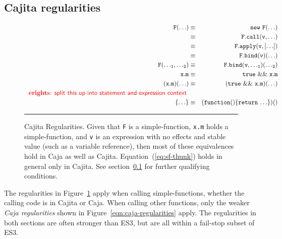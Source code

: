\documentclass[letterpaper,twocolumn,10pt]{article}
\newcommand{\code}[1]{{\tt {#1}}}              %
\begin{document}
\subsection{Cajita regularities}
\label{subsec:cajita-reg}

\begin{figure}
\begin{eqnarray}
  \code{F(\ldots)}                & \equiv & \code{new\ F(\ldots)}                     \label{eq:sf-new} \\
                                  & \equiv & \code{F.call(v,\ldots)}                   \label{eq:sf-call} \\
                                  & \equiv & \code{F.apply(v,[\ldots])}                \label{eq:sf-apply} \\
                                  & \equiv & \code{F.bind(v)(\ldots)}                  \label{eq:sf-bind-1} \\
  \code{F({\ldots}_1,{\ldots}_2)} & \equiv & \code{F.bind(v,{\ldots}_1)({\ldots}_2)}   \label{eq:sf-bind-n} \\
  \code{x.m}                      & \equiv & \code{true\ \&\&\ x.m}                    \label{eq:sf-true} \\
  \code{(x.m)(\ldots)}            & \equiv & \code{(true\ \&\&\ x.m)(\ldots)}          \label{eq:sf-true-call} \\
  \mbox{\TODO{erights}{split this up into statement and expression context}}\\
  \code{\{{\ldots}\}}             & \equiv & \code{(function()\{return\ {\ldots\}})()} \label{eq:sf-thunk}
\end{eqnarray}

\caption[Cajita Regularities.]{Cajita Regularities. Given that \code{F} is a simple-function, \code{x.m} holds a 
simple-function, and \code{v} is an expression with no effects and stable value (such as a variable reference), then 
most of these equivalences hold in Caja as well as Cajita. Equation~(\ref{eq:sf-thunk}) holds in general only in 
Cajita. See section~\ref{subsec:cajita-reg} for further qualifying conditions. \\ } \hrule
\label{eqn:simple-func}
\end{figure}

The regularities in Figure~\ref{eqn:simple-func} apply when calling simple-functions, whether the 
calling code is in Cajita or Caja. When calling other functions, only the 
weaker \emph{Caja regularities} shown in Figure~\ref{eqn:caja-regularities} apply. The 
regularities in both sections are often stronger than ES3, but are all within 
a fail-stop subset of ES3.
\end{document}
